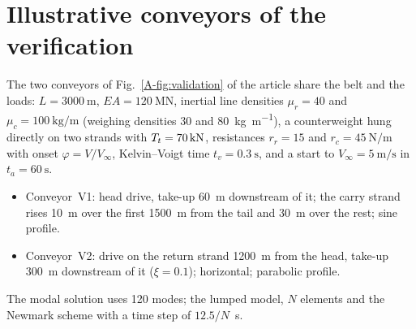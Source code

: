 \section{Illustrative conveyors of the verification}\label{sec:supp_lumped}

The two conveyors of Fig.~\ref{A-fig:validation} of the article share the belt and the loads:
$L=\qty{3000}{\metre}$, $EA=\qty{120}{\mega\newton}$, inertial line densities
$\mu_r=40$ and $\mu_c=\qty{100}{\kilo\gram\per\metre}$ (weighing densities 30 and
\qty{80}{\kilo\gram\per\metre}), a counterweight hung directly on two strands with
$T_t=\qty{70}{\kilo\newton}$, resistances $r_r=15$ and $r_c=\qty{45}{\newton\per\metre}$ with
onset $\varphi=V/V_\infty$, Kelvin--Voigt time $t_v=\qty{0.3}{\second}$, and a start to
$V_\infty=\qty{5}{\metre\per\second}$ in $t_a=\qty{60}{\second}$.
\begin{itemize}
  \item Conveyor~V1: head drive, take-up \qty{60}{\metre} downstream of it; the carry strand rises
  \qty{10}{\metre} over the first \qty{1500}{\metre} from the tail and \qty{30}{\metre} over the
  rest; sine profile.
  \item Conveyor~V2: drive on the return strand \qty{1200}{\metre} from the head, take-up
  \qty{300}{\metre} downstream of it ($\xi=0.1$); horizontal; parabolic profile.
\end{itemize}
The modal solution uses 120 modes; the lumped model, $N$ elements and the Newmark scheme with a
time step of $12.5/N$~s.
